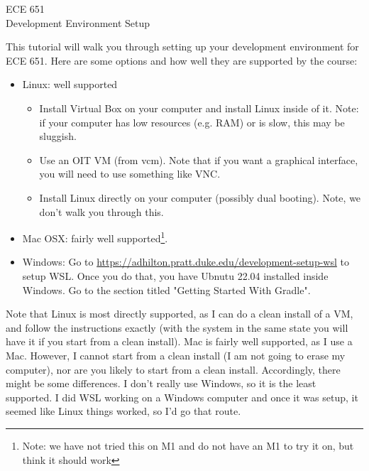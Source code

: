 \documentclass[12pt]{article}
\begin{document}
\begin{center}
  {\Large ECE 651\\ Development Environment Setup}
\end{center}


This tutorial will walk you through setting up your development
environment for ECE 651.  Here are some options and how well they
are supported by the course:

\begin{itemize}
\item Linux: well supported
  \begin{itemize}
  \item Install Virtual Box on your computer and install Linux inside of it.  Note:  if your computer has low resources (e.g. RAM) or is slow, this may be sluggish.
  \item Use an OIT VM (from vcm).  Note that if you want a graphical interface, you will need to use something like VNC. 
  \item Install Linux directly on your computer (possibly dual booting).  Note, we don't walk you through this. 
  \end{itemize}
\item Mac OSX: fairly well supported\footnote{Note: we have not tried this on M1 and do not have an M1 to try it on, but think it should work}.
\item Windows: Go to \url{https://adhilton.pratt.duke.edu/development-setup-wsl} to setup WSL.  Once you do that, you have Ubnutu 22.04 installed inside Windows.  Go to the section titled "Getting Started With Gradle". 
\end{itemize}

Note that Linux is most directly supported, as I can do a clean
install of a VM, and follow the instructions exactly (with the system
in the same state you will have it if you start from a clean install).
Mac is fairly well supported, as I use a Mac.  However, I cannot start from a clean install
(I am not going to erase my computer), nor are you likely to start from a clean install.  Accordingly,
there might be some differences.   I don't really use Windows, so it is the least supported.  I did WSL
working on a Windows computer and once it was setup, it seemed like Linux things worked, so I'd go that route.
\end{document}
